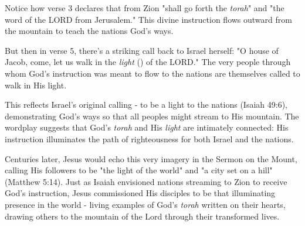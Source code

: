 \documentclass[11pt]{article}
\begin{document}
\vspace{1em}


\vspace{1em}
Notice how verse 3 declares that from Zion "shall go forth the \textit{torah}" and "the word of the LORD from Jerusalem." This divine instruction flows outward from the mountain to teach the nations God's ways. 

\vspace{1em}
But then in verse 5, there's a striking call back to Israel herself: "O house of Jacob, come, let us walk in the \textit{light} () of the LORD." The very people through whom God's instruction was meant to flow to the nations are themselves called to walk in His light.

\vspace{1em}
This reflects Israel's original calling - to be a light to the nations (Isaiah 49:6), demonstrating God's ways so that all peoples might stream to His mountain. The wordplay suggests that God's \textit{torah} and His \textit{light} are intimately connected: His instruction illuminates the path of righteousness for both Israel and the nations.

\vspace{1em}
Centuries later, Jesus would echo this very imagery in the Sermon on the Mount, calling His followers to be "the light of the world" and "a city set on a hill" (Matthew 5:14). Just as Isaiah envisioned nations streaming to Zion to receive God's instruction, Jesus commissioned His disciples to be that illuminating presence in the world - living examples of God's \textit{torah} written on their hearts, drawing others to the mountain of the Lord through their transformed lives.

\begin{thesauce}

\end{thesauce}
\end{document}
